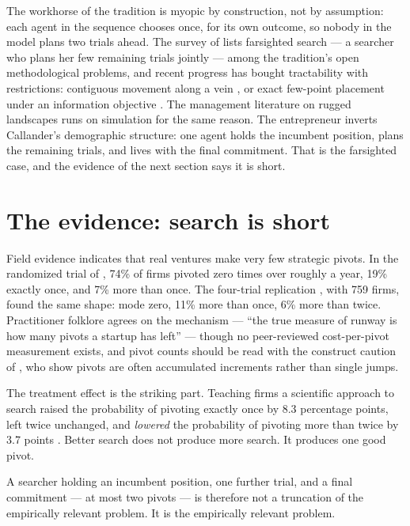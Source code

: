 \documentclass[11pt]{article}
\theoremstyle{itheads}
\begin{document}
The workhorse of the tradition is myopic by construction, not by
assumption: each agent in the sequence chooses once, for its own
outcome, so nobody in the model plans two trials ahead. The survey of \citet{bardhicallander2026} lists
farsighted search --- a searcher who plans her few remaining trials
jointly --- among the tradition's open methodological problems, and
recent progress has bought tractability with restrictions: contiguous
movement along a vein \citep{urgunyariv2025, wong2025}, or exact
few-point placement under an information objective \citep{bardhi2024}.
The management literature on rugged landscapes \citep{baumann2019}
runs on simulation for the same reason. The entrepreneur inverts
Callander's demographic structure: one agent holds the incumbent
position, plans the remaining trials, and lives with the final
commitment. That is the farsighted case, and the evidence of the next
section says it is short.

\section{The evidence: search is short}

Field evidence indicates that real ventures make very few strategic
pivots. In the randomized trial of \citet{camuffo2020}, 74\% of firms
pivoted zero times over roughly a year, 19\% exactly once, and 7\% more
than once. The four-trial replication \citep{camuffo2024}, with 759
firms, found the same shape: mode zero, 11\% more than once, 6\% more
than twice. Practitioner folklore agrees on the mechanism ---
``the true measure of runway is how many pivots a startup has left''
\citep{ries2011} --- though no peer-reviewed cost-per-pivot measurement
exists, and pivot counts should be read with the construct caution of
\citet{kirtley2023}, who show pivots are often accumulated increments
rather than single jumps.

The treatment effect is the striking part. Teaching firms a scientific
approach to search raised the probability of pivoting exactly once by
8.3 percentage points, left twice unchanged, and \emph{lowered} the
probability of pivoting more than twice by 3.7 points
\citep{camuffo2024}. Better search does not produce more search. It
produces one good pivot.

A searcher holding an incumbent position, one further trial, and a
final commitment --- at most two pivots --- is therefore not a
truncation of the empirically relevant problem. It is the empirically
relevant problem.
\end{document}
